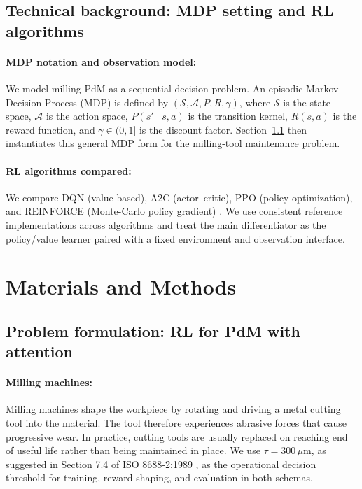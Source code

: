 \documentclass[sn-vancouver-num]{sn-jnl}%
\begin{document}
\subsection{Technical background: MDP setting and RL algorithms}
\label{sec:tech_background}
\paragraph{MDP notation and observation model:}
We model milling PdM as a sequential decision problem. An episodic Markov Decision Process (MDP) is defined by $(\mathcal{S},\mathcal{A},P,R,\gamma)$, where $\mathcal{S}$ is the state space, $\mathcal{A}$ is the action space, $P(s'\mid s,a)$ is the transition kernel, $R(s,a)$ is the reward function, and $\gamma\in(0,1]$ is the discount factor. Section~\ref{sec:env} then instantiates this general MDP form for the milling-tool maintenance problem.

\paragraph{RL algorithms compared:}
We compare DQN (value-based), A2C (actor--critic), PPO (policy optimization), and \textsc{REINFORCE} (Monte-Carlo policy gradient) \cite{Mnih2015, Schulman2017, Williams1992}. We use consistent reference implementations across algorithms and treat the main differentiator as the policy/value learner paired with a fixed environment and observation interface.

\section{Materials and Methods}
\label{sec:method}

\subsection{Problem formulation: RL for PdM with attention}
\label{sec:env} \label{app:env_reward}
\paragraph{Milling machines:}
Milling machines shape the workpiece by rotating and driving a metal cutting tool into the material. The tool therefore experiences abrasive forces that cause progressive wear. In practice, cutting tools are usually replaced on reaching end of useful life rather than being maintained in place. We use $\tau = 300\,\mu\mathrm{m}$, as suggested in Section 7.4 of ISO 8688-2:1989 \citep{ISO8688-2-1989}, as the operational decision threshold for training, reward shaping, and evaluation in both schemas. 
\end{document}
